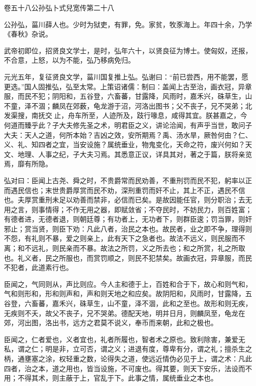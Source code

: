 \documentclass[12pt,UTF8]{ctexbook}
\begin{document}
卷五十八公孙弘卜式兒宽传第二十八



公孙弘，菑川薛人也。少时为狱吏，有罪，免。家贫，牧豕海上。年四十余，乃学《春秋》杂说。



武帝初即位，招贤良文学士，是时，弘年六十，以贤良征为博士。使匈奴，还报，不合意，上怒，以为不能，弘乃移病免归。



元光五年，复征贤良文学，菑川国复推上弘。弘谢曰：“前已尝西，用不能罢，愿更选。”国人固推弘，弘至太常。上策诏诸儒：制曰：盖闻上古至治，画衣冠，异章服，而民不犯；阴阳和，五谷登，六畜蕃，甘露降，风雨时，嘉禾兴，硃草生，山不童，泽不涸；麟凤在郊薮，龟龙游于沼，河洛出图书；父不丧子，兄不哭弟；北发渠搜，南抚交止，舟车所至，人迹所及，跂行喙息，咸得其宜。朕甚嘉之，今何道而臻乎此？子大夫修先圣之术，明君臣之义，讲论洽闻，有声乎当世，敢问子大夫：天人之道，何所本始？吉凶之效，安所期焉？禹、汤水旱，厥咎何由？仁、义、礼、知四者之宜，当安设施？属统垂业，物鬼变化，天命之符，废兴何如？天文、地理、人事之纪，子大夫习焉。其悉意正议，详具其对，著之于篇，朕将亲览焉，靡有所隐。



弘对曰：臣闻上古尧、舜之时，不贵爵常而民劝善，不重刑罚而民不犯，躬率以正而遇民信也；末世贵爵厚赏而民不劝，深刑重罚而奸不止，其上不正，遇民不信也。夫厚赏重刑未足以劝善而禁非，必信而已矣。是故因能任官，则分职治；去无用之言，则事情得；不作无用之器，即赋敛省；不夺民时，不妨民力，则百姓富；有德者进，无德者退，则朝廷尊；有功者上，无功者下，则群臣逡；罚当罪，则奸邪止；赏当贤，则臣下劝：凡此八者，治民之本也。故民者，业之即不争，理得则不怨，有礼则不暴，爱之则亲上，此有天下之急者也。故法不远义，则民服而不离；和不远礼，则民亲而不暴。故法之所罚，义之所去也；和之所赏，礼之所取也。礼义者，民之所服也，而赏罚顺之，则民不犯禁矣。故画衣冠，异章服，而民不犯者，此道素行也。



臣闻之，气同则从，声比则应。今人主和德于上，百姓和合于下，故心和则气和，气和则形和，形和则声和，声和则天地之和应矣。故阴阳和，风雨时，甘露降，五谷登，六畜蕃，嘉禾兴，硃草生，山不童，泽不涸，此和之至也。故形和则无疾，无疾则不夭，故父不丧子，兄不哭弟。德配天地，明并日月，则麟凤至，龟龙在郊，河出图，洛出书，远方之君莫不说义，奉币而来朝，此和之极也。



臣闻之，仁者爱也，义者宜也，礼者所履也，智者术之原也。致利除害，兼爱无私，谓之仁；明是非，立可否，谓之义；进退有度，尊卑有分，谓之礼；擅杀生之柄，通壅塞之涂，权轻重之数，论得失之道，使远近情伪必见于上，谓之术：凡此四者，治之本，道之用也，皆当设施，不可废也。得其要，则天下安乐，法设而不用；不得其术，则主蔽于上，官乱于下。此事之情，属统垂业之本也。
\end{document}
